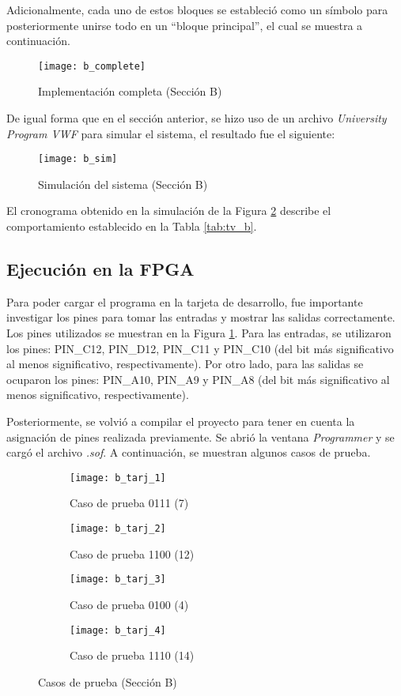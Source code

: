\documentclass[../procedimientos.tex]{subfiles}
\begin{document}
Adicionalmente, cada uno de estos bloques se estableció como un símbolo para 
posteriormente unirse todo en un ``bloque principal'', el cual se muestra a 
continuación.
\begin{figure}[H]
  \centering
  \texttt{[image: b\_complete]}
  \caption{Implementación completa (Sección B)}
  \label{fig:b_complete}
\end{figure}

De igual forma que en el sección anterior, se hizo uso de un archivo 
\textit{University Program VWF} para simular el sistema, el resultado fue el 
siguiente:
\begin{figure}[H]
  \centering
  \texttt{[image: b\_sim]}
  \caption{Simulación del sistema (Sección B)}
  \label{fig:b_sim}
\end{figure}

El cronograma obtenido en la simulación de la Figura \ref{fig:b_sim} describe 
el comportamiento establecido en la Tabla \ref{tab:tv_b}.

\subsection{Ejecución en la FPGA}
Para poder cargar el programa en la tarjeta de desarrollo, fue importante 
investigar los pines para tomar las entradas y mostrar las salidas 
correctamente. Los pines utilizados se muestran en la Figura 
\ref{fig:b_complete}. Para las entradas, se utilizaron los pines: PIN\_C12, 
PIN\_D12, PIN\_C11 y PIN\_C10 (del bit más significativo al menos 
significativo, respectivamente). Por otro lado, para las salidas se ocuparon 
los pines: PIN\_A10, PIN\_A9 y PIN\_A8 (del bit más significativo al menos 
significativo, respectivamente).

Posteriormente, se volvió a compilar el proyecto para tener en cuenta la 
asignación de pines realizada previamente. Se abrió la ventana 
\textit{Programmer} y se cargó el archivo \textit{.sof}. A continuación, se 
muestran algunos casos de prueba.
\begin{figure}[H]
  \centering
  \begin{subfigure}[b]{0.45\textwidth}
    \centering
    \caption{Caso de prueba 0111 (7)}
    \label{fig:b_tarj_1}
    \texttt{[image: b\_tarj\_1]}
  \end{subfigure}
  \begin{subfigure}[b]{0.45\textwidth}
    \centering
    \caption{Caso de prueba 1100 (12)}
    \label{fig:b_tarj_2}
    \texttt{[image: b\_tarj\_2]}
  \end{subfigure}
  \begin{subfigure}[b]{0.45\textwidth}
    \centering
    \caption{Caso de prueba 0100 (4)}
    \label{fig:b_tarj_3}
    \texttt{[image: b\_tarj\_3]}
  \end{subfigure}
  \begin{subfigure}[b]{0.45\textwidth}
    \centering
    \caption{Caso de prueba 1110 (14)}
    \label{fig:b_tarj_4}
    \texttt{[image: b\_tarj\_4]}
  \end{subfigure}
  \caption{Casos de prueba (Sección B)}
\end{figure}
\end{document}
